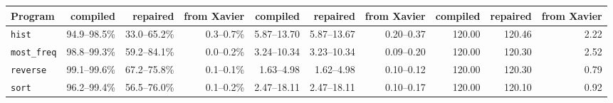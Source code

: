 \begin{tabular}{lrrrrrrrrr}
\toprule
Program & compiled & repaired & from Xavier & compiled & repaired & from Xavier & compiled & repaired & from Xavier \\
\midrule
\texttt{hist} & 94.9--98.5\% & 33.0--65.2\% & 0.3--0.7\% & 5.87--13.70 & 5.87--13.67 & 0.20--0.37 & 120.00 & 120.46 & 2.22 \\
\texttt{most\_freq} & 98.8--99.3\% & 59.2--84.1\% & 0.0--0.2\% & 3.24--10.34 & 3.23--10.34 & 0.09--0.20 & 120.00 & 120.30 & 2.52 \\
\texttt{reverse} & 99.1--99.6\% & 67.2--75.8\% & 0.1--0.1\% & 1.63--4.98 & 1.62--4.98 & 0.10--0.12 & 120.00 & 120.30 & 0.79 \\
\texttt{sort} & 96.2--99.4\% & 56.5--76.0\% & 0.1--0.2\% & 2.47--18.11 & 2.47--18.11 & 0.10--0.17 & 120.00 & 120.10 & 0.92 \\
\bottomrule
\end{tabular}
